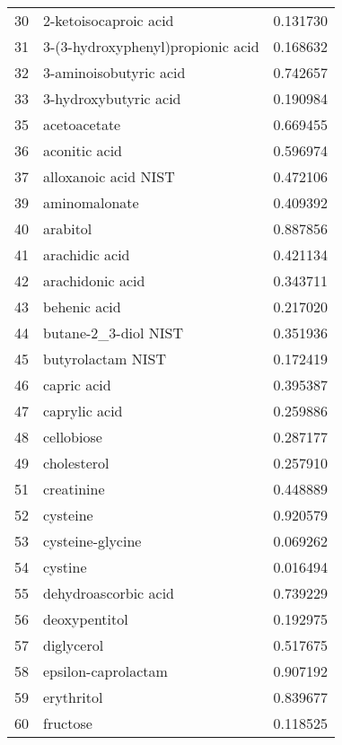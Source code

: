 \begin{tabular}{llr}
30  &              2-ketoisocaproic acid &  0.131730 \\
31  &  3-(3-hydroxyphenyl)propionic acid &  0.168632 \\
32  &             3-aminoisobutyric acid &  0.742657 \\
33  &              3-hydroxybutyric acid &  0.190984 \\
35  &                       acetoacetate &  0.669455 \\
36  &                      aconitic acid &  0.596974 \\
37  &               alloxanoic acid NIST &  0.472106 \\
39  &                      aminomalonate &  0.409392 \\
40  &                           arabitol &  0.887856 \\
41  &                     arachidic acid &  0.421134 \\
42  &                   arachidonic acid &  0.343711 \\
43  &                       behenic acid &  0.217020 \\
44  &               butane-2\_3-diol NIST &  0.351936 \\
45  &                  butyrolactam NIST &  0.172419 \\
46  &                        capric acid &  0.395387 \\
47  &                      caprylic acid &  0.259886 \\
48  &                         cellobiose &  0.287177 \\
49  &                        cholesterol &  0.257910 \\
51  &                         creatinine &  0.448889 \\
52  &                           cysteine &  0.920579 \\
53  &                   cysteine-glycine &  0.069262 \\
54  &                            cystine &  0.016494 \\
55  &               dehydroascorbic acid &  0.739229 \\
56  &                      deoxypentitol &  0.192975 \\
57  &                         diglycerol &  0.517675 \\
58  &                epsilon-caprolactam &  0.907192 \\
59  &                         erythritol &  0.839677 \\
60  &                           fructose &  0.118525 \\

\end{tabular}
